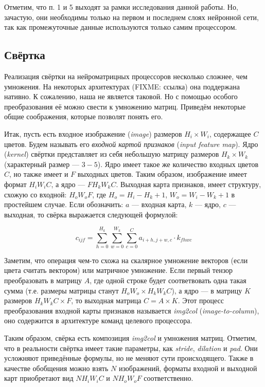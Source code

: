 Отметим, что п. 1 и 5 выходят за рамки исследования данной работы.
Но, зачастую, они необходимы только на первом и последнем слоях нейронной сети,
так как промежуточные данные используются только самим процессором.

\subsection{Свёртка}

Реализация свёртки на нейроматрицных процессоров несколько сложнее, чем умножения.
На некоторых архитектурах (FIXME: ссылка) она поддержана нативно. К сожалению, наша
не является таковой. Но с помощью особого преобразования её можно свести к 
умножению матриц. Приведём некоторые общие соображения, которые позволят понять его.

Итак, пусть есть входное изображение (\textit{image}) размеров $H_i \times W_i$,
содержащее $C$ цветов. Будем называть его \textit{входной картой признаков}
(\textit{input feature map}). Ядро (\textit{kernel}) свёртки представляет из
себя небольшую матрицу размеров $H_k \times W_k$ (характерный размер --- $3-5$).
Ядро имеет такое же количество входных цветов $C$, но также имеет и $F$
выходных цветов. Таким образом, изображение имеет формат $H_i W_i C$,
а ядро --- $F H_k W_k C$. Выходная карта признаков, имеет структуру, схожую
со входной: $H_o W_o F$, где $H_o = H_i - H_k + 1$, $W_o = W_i - W_k + 1$
в простейшем случае. Если обозначить: $a$ --- входная карта, $k$ --- ядро,
$c$ --- выходная, то свёрка выражается следующей формулой:

\[
    c_{ijf} = \sum \limits_{h = 0}^{H_k} \sum \limits_{w = 0}^{W_k}
              \sum \limits_{c = 0}^{C} a_{i+h, j+w, c} \cdot k_{f h w c}
\]

Заметим, что операция чем-то схожа на скалярное умножение векторов
(если цвета считать вектором) или матричное умножение. Если первый тензор
преобразовать в матрицу $A$, где одной строке будет соответвовать одна
такая сумма (т.е. размеры матрицы станут $H_o W_o \times H_k W_k C$), а
ядро --- в матрицу $K$ размеров $H_k W_k C \times F$, то выходная
матрица $C = A \times K$. Этот процесс преобразования входной карты
признаков называется \textit{img2col} (\textit{image-to-column}),
оно содержится в архитектуре команд целевого процессора.

Таким образом, свёрка есть композиция \textit{img2col} и умножения матриц.
Отметим, что в реальности свёртка имеет такие параметры, как
\textit{stride}, \textit{dilation} и \textit{pad}. Они усложняют
приведённые формулы, но не меняют сути происходящего. Также в
качестве обобщения можно взять $N$ изображений, форматы входной и
выходной карт приобретают вид $N H_i W_i C$ и $N H_o W_o F$ соответственно.

\newpage
